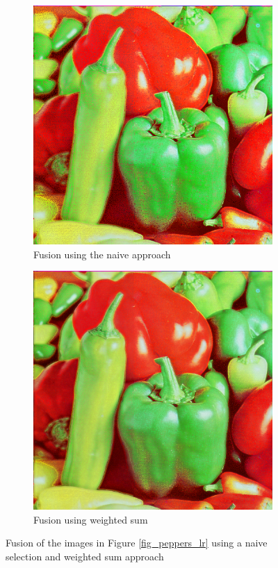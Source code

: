 \documentclass{article}
\begin{document}
\begin{figure}
	\centering
	\begin{subfigure}[b]{0.45\textwidth}
		\centering
		\includegraphics[width=\textwidth]{figures/peppers/peppers_fused_naive}
		\caption{Fusion using the naive approach}
		\label{fig_naive_fusion}
	\end{subfigure}
	\begin{subfigure}[b]{0.45\textwidth}
		\centering
		\includegraphics[width=\textwidth]{figures/peppers/peppers_fused}
		\caption{Fusion using weighted sum}
		\label{fig_weighted_fusion}
	\end{subfigure}
	\caption{Fusion of the images in Figure \ref{fig_peppers_lr} using a naive selection and weighted sum approach}
\end{figure}
\end{document}
